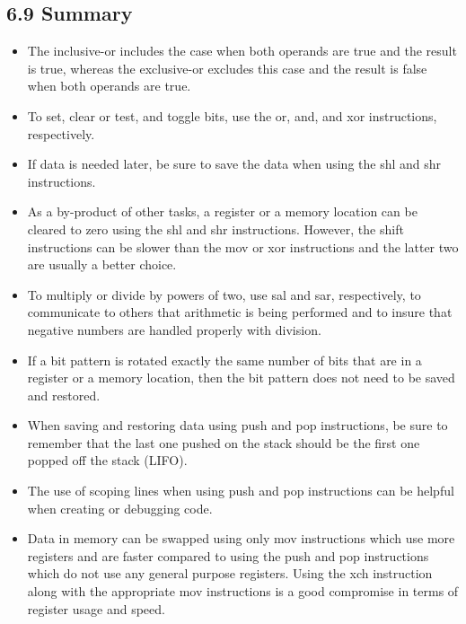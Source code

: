 \documentclass[10pt]{book}
\begin{document}
\subsection*{6.9 Summary}
\begin{itemize}
  \item The inclusive-or includes the case when both operands are true and the result is true, whereas the exclusive-or excludes this case and the result is false when both operands are true.
  \item To set, clear or test, and toggle bits, use the or, and, and xor instructions, respectively.
  \item If data is needed later, be sure to save the data when using the shl and shr instructions.
  \item As a by-product of other tasks, a register or a memory location can be cleared to zero using the shl and shr instructions. However, the shift instructions can be slower than the mov or xor instructions and the latter two are usually a better choice.
  \item To multiply or divide by powers of two, use sal and sar, respectively, to communicate to others that arithmetic is being performed and to insure that negative numbers are handled properly with division.
  \item If a bit pattern is rotated exactly the same number of bits that are in a register or a memory location, then the bit pattern does not need to be saved and restored.
  \item When saving and restoring data using push and pop instructions, be sure to remember that the last one pushed on the stack should be the first one popped off the stack (LIFO).
  \item The use of scoping lines when using push and pop instructions can be helpful when creating or debugging code.
  \item Data in memory can be swapped using only mov instructions which use more registers and are faster compared to using the push and pop instructions which do not use any general purpose registers. Using the xch instruction along with the appropriate mov instructions is a good compromise in terms of register usage and speed.
\end{itemize}


\end{document}
